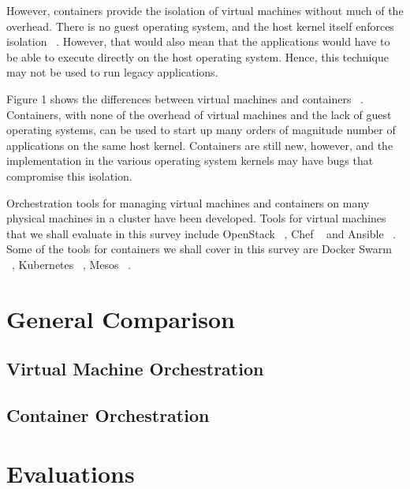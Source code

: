 \documentclass[10pt,twocolumn]{article}
\begin{document}
However, containers provide the isolation of virtual machines without much of the overhead. There is no guest operating system, and the host kernel itself enforces isolation ~\cite{intro_containerisation}.
However, that would also mean that the applications would have to be able to execute directly on the host operating system.
Hence, this technique may not be used to run legacy applications.

Figure 1 shows the differences between virtual machines and containers ~\cite{intro_containerisation}.
Containers, with none of the overhead of virtual machines and the lack of guest operating systems, can be used to start up many orders of magnitude number of applications on the same host kernel.
Containers are still new, however, and the implementation in the various operating system kernels may have bugs that compromise this isolation.

Orchestration tools for managing virtual machines and containers on many physical machines in a cluster have been developed.
Tools for virtual machines that we shall evaluate in this survey include OpenStack ~\cite{openstack}, Chef ~\cite{chef} and Ansible ~\cite{ansible}.
Some of the tools for containers we shall cover in this survey are Docker Swarm ~\cite{docker_swarm}, Kubernetes ~\cite{kubernetes}, Mesos ~\cite{mesos}.

\section{General Comparison}



\subsection{Virtual Machine Orchestration}



\subsection{Container Orchestration}



\section{Evaluations}
\end{document}

